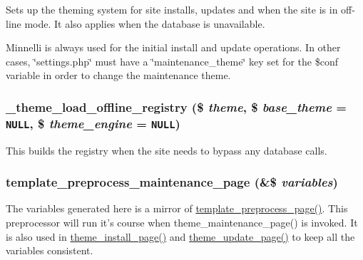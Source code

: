 Sets up the theming system for site installs, updates and when the site is in off-line mode. It also applies when the database is unavailable.

Minnelli is always used for the initial install and update operations. In other cases, \char`\"{}settings.php\char`\"{} must have a \char`\"{}maintenance\_\-theme\char`\"{} key set for the \$conf variable in order to change the maintenance theme. \hypertarget{theme_8maintenance_8inc_7bf7a7faa37b3475038eca9a2ecf97e5}{
\subsubsection[{\_\-theme\_\-load\_\-offline\_\-registry}]{\setlength{\rightskip}{0pt plus 5cm}\_\-theme\_\-load\_\-offline\_\-registry (\$ {\em theme}, \/  \$ {\em base\_\-theme} = {\tt NULL}, \/  \$ {\em theme\_\-engine} = {\tt NULL})}}
\label{theme_8maintenance_8inc_7bf7a7faa37b3475038eca9a2ecf97e5}


This builds the registry when the site needs to bypass any database calls. \hypertarget{theme_8maintenance_8inc_14a92df5f5e74cebcf7fb680885e58a5}{
\subsubsection[{template\_\-preprocess\_\-maintenance\_\-page}]{\setlength{\rightskip}{0pt plus 5cm}template\_\-preprocess\_\-maintenance\_\-page (\&\$ {\em variables})}}
\label{theme_8maintenance_8inc_14a92df5f5e74cebcf7fb680885e58a5}


The variables generated here is a mirror of \hyperlink{includes_2theme_8inc_128dae24f990d8ba4710ac78b0584c11}{template\_\-preprocess\_\-page()}. This preprocessor will run it's course when theme\_\-maintenance\_\-page() is invoked. It is also used in \hyperlink{theme_8maintenance_8inc_5f691f589f18990cce7f967be939172d}{theme\_\-install\_\-page()} and \hyperlink{theme_8maintenance_8inc_c6c65623ac5a4e2ba448b2df7a1ccd66}{theme\_\-update\_\-page()} to keep all the variables consistent.

